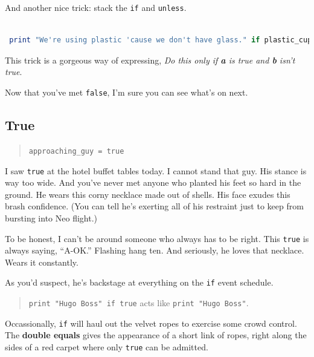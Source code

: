 \documentclass[10pt,twoside]{report}
\begin{document}
And another nice trick: stack the \lstinline[breaklines=true]|if| and
\lstinline[breaklines=true]|unless|.


\begin{lstlisting}[basicstyle=\ttfamily\color{basiccolor},
    commentstyle = \ttfamily\color{commentcolor},
    keywordstyle=\ttfamily\color{keywordscolor},
    stringstyle=\color{stringcolor},
    language=Ruby,
    basicstyle=\small\ttfamily,
    showstringspaces=false,
  ]

 print "We're using plastic 'cause we don't have glass." if plastic_cup unless glass_cup

\end{lstlisting}


This trick is a gorgeous way of expressing, {\em Do this only if {\bf
    a} is true and {\bf b} isn't true}.

Now that you've met \lstinline[breaklines=true]|false|, I'm sure you
can see what's on next.


\subsection{True}



\begin{quote}
\lstinline[breaklines=true]|approaching_guy = true|\end{quote}


I saw \lstinline[breaklines=true]|true| at the hotel buffet tables
today.  I cannot stand that guy. His stance is way too wide.  And
you've never met anyone who planted his feet so hard in the ground.
He wears this corny necklace made out of shells.  His face exudes this
brash confidence.  (You can tell he's exerting all of his restraint
just to keep from bursting into Neo flight.)

To be honest, I can't be around someone who always has to be
right. This \lstinline[breaklines=true]|true| is always saying,
``A-OK.''  Flashing hang ten.  And seriously, he loves that necklace.
Wears it constantly.

As you'd suspect, he's backstage at everything on the
\lstinline[breaklines=true]|if| event schedule.

\begin{quote}
\lstinline[breaklines=true]|print "Hugo Boss" if true| acts like
\lstinline[breaklines=true]|print "Hugo Boss"|.\end{quote}


Occassionally, \lstinline[breaklines=true]|if| will haul out the
velvet ropes to exercise some crowd control.  The {\bf double equals}
gives the appearance of a short link of ropes, right along the sides
of a red carpet where only \lstinline[breaklines=true]|true| can be
admitted.
\end{document}
